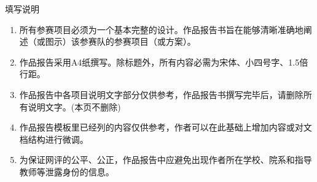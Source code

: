 
\begin{center}
  {\heiti{}填写说明}
\end{center}

\vspace{0.6em}

\begin{enumerate}[label=\arabic*., leftmargin=2em, itemsep=0pt, topsep=0pt]
  \item 所有参赛项目必须为一个基本完整的设计。作品报告书旨在能够清晰准确地阐述（或图示）该参赛队的参赛项目（或方案）。
  \item 作品报告采用A4纸撰写。除标题外，所有内容必需为宋体、小四号字、1.5倍行距。
  \item 作品报告中各项目说明文字部分仅供参考，作品报告书撰写完毕后，请删除所有说明文字。(本页不删除)
  \item 作品报告模板里已经列的内容仅供参考，作者可以在此基础上增加内容或对文档结构进行微调。
  \item 为保证网评的公平、公正，作品报告中应避免出现作者所在学校、院系和指导教师等泄露身份的信息。
\end{enumerate}